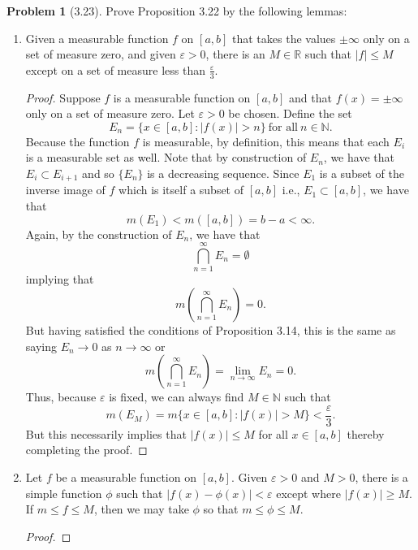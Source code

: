 \documentclass[12pt]{article}
\newcommand{\R}{\mathbb{R}}
\newcommand{\N}{\mathbb{N}}
\renewcommand{\epsilon}{\varepsilon}
\theoremstyle{definition}
\newtheorem{problem}{Problem}
\begin{document}
\begin{problem}[3.23] Prove Proposition 3.22 by the following lemmas:

    \begin{enumerate}[label = \alph{*}.]
        \item Given a measurable function \( f \) on \( [a,b] \) that takes the values \( \pm \infty \) only on a set of measure zero, and given \( \epsilon > 0 \), there is an \( M \in \R \) such that \( |f| \leq M \) except on a set of measure less than \( \displaystyle \frac{\epsilon}{3} \).
            \begin{proof}

                Suppose \( f \) is a measurable function  on \( [a,b] \) and that \( f(x) = \pm \infty \) only on a set of measure zero. Let \( \epsilon > 0 \) be chosen. Define the set 
                    \[
                        E_n = \{ x \in [a,b]: |f(x)| > n \} \ \text{for all} \ n \in \N.  
                    \]
                Because the function \( f \) is measurable, by definition, this means that each \( E_i \) is a measurable set as well. Note that by construction of \( E_n \), we have that \( E_{i} \subset E_{i+1} \) and so \( \{ E_n \} \) is a decreasing sequence. Since \( E_1 \) is a subset of the inverse image of \( f \) which is itself a subset of \( [a,b] \) i.e., \( E_1 \subset [a,b] \), we have that
                    \[
                        m(E_1) < m([a,b]) = b - a < \infty.  
                    \]
                Again, by the construction of \( E_n \), we have that 
                    \[
                        \bigcap_{n=1}^{\infty} E_n = \emptyset   
                    \]
                implying that 
                    \[
                        m\left( \bigcap_{n=1}^{\infty} E_n \right) = 0.
                    \]
                But having satisfied the conditions of Proposition 3.14, this is the same as saying \( E_n \to 0 \) as \( n \to \infty \) or
                    \[
                        m\left( \bigcap_{n=1}^{\infty} E_n \right) = \lim_{n \to \infty} E_n = 0.
                    \]
                Thus, because \( \epsilon \) is fixed, we can always find \( M \in \N \) such that
                    \[
                        m(E_M) = m\{x \in [a,b]: |f(x)| > M\} < \frac{\epsilon}{3}.
                    \]
                But this necessarily implies that \( |f(x)| \leq M \) for all \( x \in [a,b] \) thereby completing the proof.  
            \end{proof}
        \item Let \( f  \) be a measurable function on \( [a,b] \). Given \( \epsilon > 0 \) and \( M > 0 \), there is a simple function \( \phi \) such that \( |f(x) - \phi(x)| < \epsilon \) except where \( |f(x)| \geq M \). If \( m \leq f \leq M \), then we may take \( \phi \) so that \( m \leq \phi \leq M \).
            \begin{proof}


\end{proof}
\end{enumerate}
\end{problem}
\end{document}

